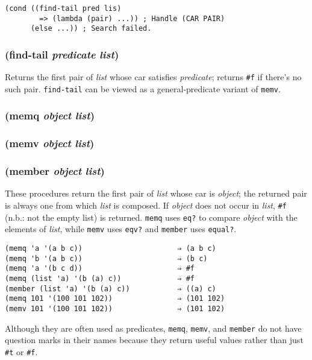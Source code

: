 \documentclass{article}
\begin{document}
\begin{verbatim}
(cond ((find-tail pred lis)
        => (lambda (pair) ...)) ; Handle (CAR PAIR)
      (else ...)) ; Search failed.
\end{verbatim}

\subsubsection{(find-tail \emph{predicate} \emph{list})}

Returns the first pair of \emph{list} whose car satisfies \emph{predicate}; returns
\verb|#f| if there's no such pair. \verb|find-tail| can be viewed as a general-predicate
variant of \verb|memv|.

\subsubsection{(memq \emph{object} \emph{list})}

\subsubsection{(memv \emph{object} \emph{list})}

\subsubsection{(member \emph{object} \emph{list})}

These procedures return the first pair of \emph{list} whose car is \emph{object}; the returned
pair is always one from which \emph{list} is composed. If \emph{object} does not occur in
\emph{list}, \verb|#f| (n.b.: not the empty list) is returned. \verb|memq| uses
\verb|eq?| to compare \emph{object} with the elements of \emph{list}, while \verb|memv|
uses \verb|eqv?| and \verb|member| uses \verb|equal?|.

\begin{verbatim}
(memq 'a '(a b c))                      ⇒ (a b c)
(memq 'b '(a b c))                      ⇒ (b c)
(memq 'a '(b c d))                      ⇒ #f
(memq (list 'a) '(b (a) c))             ⇒ #f
(member (list 'a) '(b (a) c))           ⇒ ((a) c)
(memq 101 '(100 101 102))               ⇒ (101 102)
(memv 101 '(100 101 102))               ⇒ (101 102)
\end{verbatim}

Although they are often used as predicates, \verb|memq|, \verb|memv|, and
\verb|member| do not have question marks in their names because they return
useful values rather than just \verb|#t| or \verb|#f|.
\end{document}
